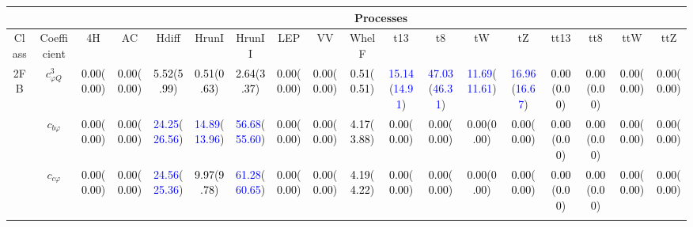 \documentclass{article}
\begin{document}
\begin{landscape}
\begin{table}[H]
\scriptsize
\centering
\begin{tabular}{|c|c|c|c|c|c|c|c|c|c|c|c|c|c|c|c|c|c|}
\hline
\multicolumn{2}{|c|}{}                 & \multicolumn{16}{c|}{Processes} \\ \hline
 Class & Coefficient & {\rm 4H }& {\rm AC }& {\rm Hdiff }& {\rm HrunI }& {\rm HrunII }& {\rm LEP }& {\rm VV }& {\rm WhelF }& {\rm t13 }& {\rm t8 }& {\rm tW }& {\rm tZ }& {\rm tt13 }& {\rm tt8 }& {\rm ttW }& {\rm ttZ }\\ \hline
\multirow{10}{*}{2FB}
 & $c_{\varphi Q}^{3}$ & \textcolor{black}{0.00}(\textcolor{black}{0.00}) & \textcolor{black}{0.00}(\textcolor{black}{0.00}) & \textcolor{black}{5.52}(\textcolor{black}{5.99}) & \textcolor{black}{0.51}(\textcolor{black}{0.63}) & \textcolor{black}{2.64}(\textcolor{black}{3.37}) & \textcolor{black}{0.00}(\textcolor{black}{0.00}) & \textcolor{black}{0.00}(\textcolor{black}{0.00}) & \textcolor{black}{0.51}(\textcolor{black}{0.51}) & \textcolor{blue}{15.14}(\textcolor{blue}{14.91}) & \textcolor{blue}{47.03}(\textcolor{blue}{46.31}) & \textcolor{blue}{11.69}(\textcolor{blue}{11.61}) & \textcolor{blue}{16.96}(\textcolor{blue}{16.67}) & \textcolor{black}{0.00}(\textcolor{black}{0.00}) & \textcolor{black}{0.00}(\textcolor{black}{0.00}) & \textcolor{black}{0.00}(\textcolor{black}{0.00}) & \textcolor{black}{0.00}(\textcolor{black}{0.00})\\ \cline{2-18}
 & $c_{b \varphi}$ & \textcolor{black}{0.00}(\textcolor{black}{0.00}) & \textcolor{black}{0.00}(\textcolor{black}{0.00}) & \textcolor{blue}{24.25}(\textcolor{blue}{26.56}) & \textcolor{blue}{14.89}(\textcolor{blue}{13.96}) & \textcolor{blue}{56.68}(\textcolor{blue}{55.60}) & \textcolor{black}{0.00}(\textcolor{black}{0.00}) & \textcolor{black}{0.00}(\textcolor{black}{0.00}) & \textcolor{black}{4.17}(\textcolor{black}{3.88}) & \textcolor{black}{0.00}(\textcolor{black}{0.00}) & \textcolor{black}{0.00}(\textcolor{black}{0.00}) & \textcolor{black}{0.00}(\textcolor{black}{0.00}) & \textcolor{black}{0.00}(\textcolor{black}{0.00}) & \textcolor{black}{0.00}(\textcolor{black}{0.00}) & \textcolor{black}{0.00}(\textcolor{black}{0.00}) & \textcolor{black}{0.00}(\textcolor{black}{0.00}) & \textcolor{black}{0.00}(\textcolor{black}{0.00})\\ \cline{2-18}
 & $c_{c \varphi}$ & \textcolor{black}{0.00}(\textcolor{black}{0.00}) & \textcolor{black}{0.00}(\textcolor{black}{0.00}) & \textcolor{blue}{24.56}(\textcolor{blue}{25.36}) & \textcolor{black}{9.97}(\textcolor{black}{9.78}) & \textcolor{blue}{61.28}(\textcolor{blue}{60.65}) & \textcolor{black}{0.00}(\textcolor{black}{0.00}) & \textcolor{black}{0.00}(\textcolor{black}{0.00}) & \textcolor{black}{4.19}(\textcolor{black}{4.22}) & \textcolor{black}{0.00}(\textcolor{black}{0.00}) & \textcolor{black}{0.00}(\textcolor{black}{0.00}) & \textcolor{black}{0.00}(\textcolor{black}{0.00}) & \textcolor{black}{0.00}(\textcolor{black}{0.00}) & \textcolor{black}{0.00}(\textcolor{black}{0.00}) & \textcolor{black}{0.00}(\textcolor{black}{0.00}) & \textcolor{black}{0.00}(\textcolor{black}{0.00}) & \textcolor{black}{0.00}(\textcolor{black}{0.00})\\ \cline{2-18}

\end{tabular}
\end{table}
\end{landscape}
\end{document}

